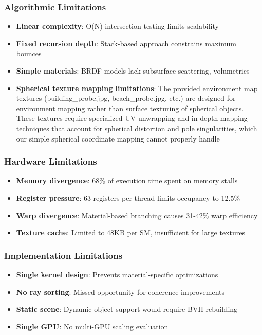 \documentclass[conference]{IEEEtran}
\begin{document}
\subsubsection{Algorithmic Limitations}
\begin{itemize}
    \item \textbf{Linear complexity}: O(N) intersection testing limits scalability
    \item \textbf{Fixed recursion depth}: Stack-based approach constrains maximum bounces
    \item \textbf{Simple materials}: BRDF models lack subsurface scattering, volumetrics
    \item \textbf{Spherical texture mapping limitations}: The provided environment map textures (building\_probe.jpg, beach\_probe.jpg, etc.) are designed for environment mapping rather than surface texturing of spherical objects. These textures require specialized UV unwrapping and in-depth mapping techniques that account for spherical distortion and pole singularities, which our simple spherical coordinate mapping cannot properly handle
\end{itemize}

\subsubsection{Hardware Limitations}
\begin{itemize}
    \item \textbf{Memory divergence}: 68\% of execution time spent on memory stalls
    \item \textbf{Register pressure}: 63 registers per thread limits occupancy to 12.5\%
    \item \textbf{Warp divergence}: Material-based branching causes 31-42\% warp efficiency
    \item \textbf{Texture cache}: Limited to 48KB per SM, insufficient for large textures
\end{itemize}

\subsubsection{Implementation Limitations}
\begin{itemize}
    \item \textbf{Single kernel design}: Prevents material-specific optimizations
    \item \textbf{No ray sorting}: Missed opportunity for coherence improvements
    \item \textbf{Static scene}: Dynamic object support would require BVH rebuilding
    \item \textbf{Single GPU}: No multi-GPU scaling evaluation
\end{itemize}
\end{document}
